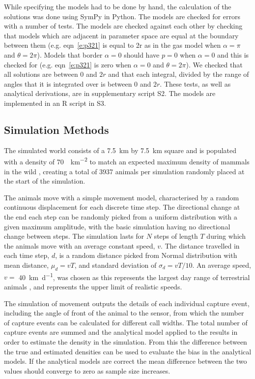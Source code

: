 \documentclass[a4paper,10pt,reqno,oneside]{amsart}
\begin{document}
While specifying the models had to be done by hand, the calculation of the solutions was done using SymPy \citep{sympy} in Python. The models are checked for errors with a number of tests. The models are checked against each other by checking that models which are adjacent in parameter space are equal at the boundary between them (e.g. eqn~\ref{e:p321} is equal to 2r as in the gas model when $\alpha=\pi$ and $\theta=2\pi$). Models that border $ \alpha = 0$ should have $p = 0$ when $ \alpha = 0$ and this is checked for (e.g. eqn~\ref{e:p321} is zero when $\alpha=0$ and $\theta=2\pi$). We checked that all solutions are between 0 and $2r$ and that each integral, divided by the range of angles that it is integrated over is between 0 and $2r$. These tests, as well as analytical derivations, are in supplementary script S2. The models are implemented in an R script in S3. 

\subsection{Simulation Methods}

The simulated world consists of a  \SI{7.5}{\kilo\meter} by \SI{7.5}{\kilo\meter} square and is populated with a density of  \SI{70}{\animals\per\kilo\meter\squared} to match an expected maximum density of mammals in the wild \citep{damuth1981population}, creating a total of 3937 animals per simulation randomly placed at the start of the simulation. 

The animals move with a simple movement model, characterised by a random continuous displacement for each discrete time step. The directional change at the end each step can be randomly picked from a uniform distribution with a given maximum amplitude, with the basic simulation having no directional change between steps. The simulation lasts for $N$ steps of length $T$ during which the animals move with an average constant speed, $v$. The distance travelled in each time step, $d$, is a random distance picked from Normal distribution with mean distance, $\mu_d = vT$,  and standard deviation of $\sigma_d = vT/10$. An average speed, $v = $ \SI{40}{\kilo\meter \per \day}, was chosen as this represents the largest day range of terrestrial animals \citep{carbone2005far}, and represents the upper limit of realistic speeds.

The simulation of movement outputs the details of each individual capture event, including the angle of front of the animal to the sensor, from which the number of capture events can be calculated for different call widths. The total number of capture events are summed and the analytical model applied to the results in order to estimate the density in the simulation. From this the difference between the true and estimated densities can be used to evaluate the bias in the analytical models. If the analytical models are correct the mean difference between the two values should converge to zero as sample size increases. 
\end{document}
